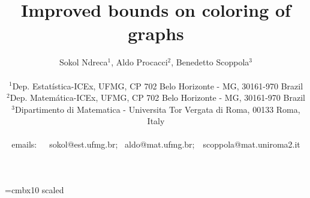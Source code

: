 \documentclass[11pt]{article}
\begin{document}
\def\VU{{\mathbb{V}}}
\def\EE{{\mathbb{E}}}
\def\GI{{\mathbb{G}}}
\def\TT{{\mathbb{T}}}
\def\C{\mathbb{C}}
\def\CC{{\mathcal C}}
\def\II{{\mathcal I}}
\def\LL{{\cal L}}
\def\RR{{\cal R}}
\def\SS{{\cal S}}
\def\NN{{\cal N}}
\def\HH{{\cal H}}
\def\GG{{\cal G}}
\def\PP{{\cal P}}
\def\AA{{\cal A}}
\def\BB{{\cal B}}
\def\FF{{\cal F}}
\def\v{\vskip.1cm}
\def\vv{\vskip.2cm}
\def\gt{{\tilde\g}}
\def\E{{\mathcal E} }
\def\I{{\rm I}}
\def\rfp{R^{*}}
\def\rd{R^{^{_{\rm D}}}}
\def\ffp{\varphi^{*}}
\def\ffpt{\widetilde\varphi^{*}}
\def\fd{\varphi^{^{_{\rm D}}}}
\def\fdt{\widetilde\varphi^{^{_{\rm D}}}}
\def\pfp{\Pi^{*}}
\def\pd{\Pi^{^{_{\rm D}}}}
\def\pbfp{\Pi^{*}}
\def\fbfp{{\bm\varphi}^{*}}
\def\fbd{{\bm\varphi}^{^{_{\rm D}}}}
\def\rfpt{{\widetilde R}^{*}}




\def\tende#1{\vtop{\ialign{##\crcr\rightarrowfill\crcr
              \noalign{\kern-1pt\nointerlineskip}
              \hskip3.pt${\scriptstyle #1}$\hskip3.pt\crcr}}}
\def\otto{{\kern-1.truept\leftarrow\kern-5.truept\to\kern-1.truept}}
\def\arm{{}}
\font\bigfnt=cmbx10 scaled

\newcommand{\card}[1]{\left|#1\right|}
\newcommand{\und}[1]{\underline{#1}}
\def\1{\rlap{\mbox{\small\rm 1}}\kern.15em 1}
\def\ind#1{\1_{\{#1\}}}
\def\bydef{:=}
\def\defby{=:}
\def\buildd#1#2{\mathrel{\mathop{\kern 0pt#1}\limits_{#2}}}
\def\card#1{\left|#1\right|}
\def\proof{\noindent{\bf Proof. }}
\def\qed{ \square}
\def\trp{\mathbb{T}}
\def\trt{\mathcal{T}}
\def\Z{\mathbb{Z}}
\def\be{\begin{equation}}
\def\ee{\end{equation}}
\def\bea{\begin{eqnarray}}
\def\eea{\end{eqnarray}}



\title {Improved bounds  on  coloring of graphs}


\author{Sokol Ndreca$^1$,   Aldo Procacci$^2$, Benedetto Scoppola$^3$ \\\\\small{$^1$Dep. Estat\' istica-ICEx, UFMG, CP 702 Belo Horizonte - MG, 30161-970 Brazil}
\\\small{$^2$Dep. Matem\'atica-ICEx, UFMG, CP 702 Belo Horizonte - MG, 30161-970 Brazil}\\
\small{$^3$Dipartimento di Matematica - Universita Tor Vergata di Roma, 00133 Roma, Italy}\\\\\footnotesize{emails:~~~{sokol@est.ufmg.br};~} { aldo@mat.ufmg.br};~~scoppola@mat.uniroma2.it}
\date{}
\maketitle
\end{document}
